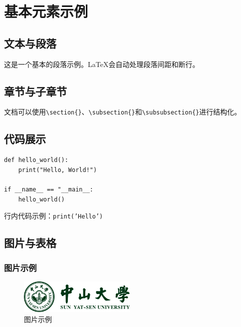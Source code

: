 \documentclass[12pt]{ctexart}
\begin{document}
\begin{sloppypar}
\renewcommand{\contentsname}{目录}
\thispagestyle{empty}
\tableofcontents
\newpage
{} 
\hypersetup{linkcolor=red}


\section{基本元素示例}

\subsection{文本与段落}
这是一个基本的段落示例。LaTeX会自动处理段落间距和断行。

\subsection{章节与子章节}
文档可以使用\verb|\section{}|、\verb|\subsection{}|和\verb|\subsubsection{}|进行结构化。

\subsection{代码展示}

\begin{verbatim}
def hello_world():
    print("Hello, World!")
    
if __name__ == "__main__:
    hello_world()
\end{verbatim}

行内代码示例：\texttt{print('Hello')}

\subsection{图片与表格}
\subsubsection{图片示例}
\begin{figure}[h!]
    \centering
    \includegraphics[width=0.5\textwidth]{figure/badge-horizonal.pdf}
    \caption{图片示例}
    \label{fig:example}
\end{figure}


\end{sloppypar}
\end{document}
